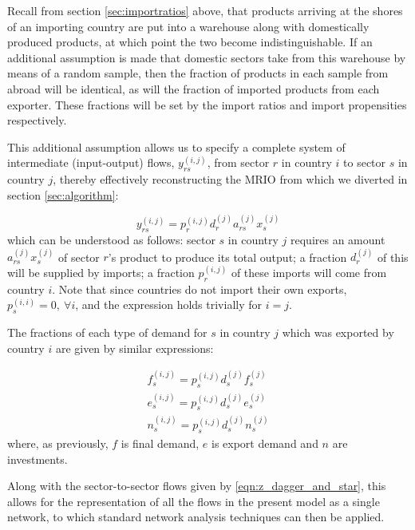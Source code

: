 \documentclass[a4paper]{article}
\begin{document}
Recall from section \ref{sec:importratios} above, that products arriving at the shores of an importing country are put into a warehouse along with domestically produced products, at which point the two become indistinguishable.
If an additional assumption is made that domestic sectors take from this warehouse by means of a random sample, then the fraction of products in each sample from abroad will be identical, as will the fraction of imported products from each exporter.
These fractions will be set by the import ratios and import propensities respectively.

This additional assumption allows us to specify a complete system of intermediate (input-output) flows, $y_{rs}^{(i,j)}$, from sector $r$ in country $i$ to sector $s$ in country $j$, thereby effectively reconstructing the MRIO from which we diverted in section \ref{sec:algorithm}:

\begin{equation}\label{eqn:y_rsij}
    y_{rs}^{(i,j)} = p_{r}^{(i,j)} d_{r}^{(j)} a_{rs}^{(j)} x_{s}^{(j)}
\end{equation}
which can be understood as follows:
sector $s$ in country $j$ requires an amount $a_{rs}^{(j)} x_{s}^{(j)}$ of sector $r$'s product to produce its total output;
a fraction $d_{r}^{(j)}$ of this will be supplied by imports;
a fraction $p_{r}^{(i,j)}$ of these imports will come from country $i$. Note that since countries do not import their own exports, $p_s^{(i,i)}=0,\ \forall i$, and the expression holds trivially for $i=j$.

The fractions of each type of demand for $s$ in country $j$ which was exported by country $i$ are given by similar expressions:

\begin{equation}\label{eqn:f_e_n_unified_network}
    \begin{aligned}
        f_{s}^{(i,j)} = p_{s}^{(i,j)} d_{s}^{(j)} f_{s}^{(j)} \\
        e_{s}^{(i,j)} = p_{s}^{(i,j)} d_{s}^{(j)} e_{s}^{(j)} \\
        n_{s}^{(i,j)} = p_{s}^{(i,j)} d_{s}^{(j)} n_{s}^{(j)}
    \end{aligned}
\end{equation}
where, as previously, $f$ is final demand, $e$ is export demand and $n$ are investments.

Along with the sector-to-sector flows given by \cref{eqn:z_dagger_and_star}, this allows for the representation of all the flows in the present model as a single network, to which standard network analysis techniques can then be applied.
\end{document}
